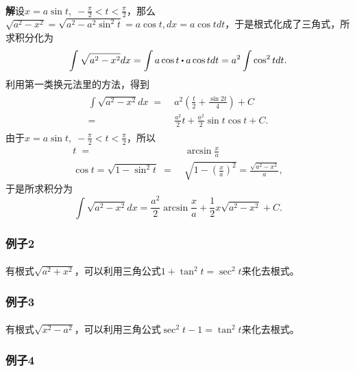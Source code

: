 \paragraph{}
\textbf{解\;}设$x=a\sin{t}, \; -\frac{\pi}{2} < t < \frac{\pi}{2}$，那么$\sqrt{a^2-x^2}=\sqrt{a^2-a^2\sin^2t} = a\cos{t}, dx = a\cos{t}dt$，于是根式化成了三角式，所求积分化为
\begin{equation}
  \int\sqrt{a^2-x^2}dx = \int a\cos{t} \bigcdot a\cos{t}dt = a^2\int \cos^2tdt.
\end{equation}
利用第一类换元法里的方法，得到
\begin{align*}
\begin{split}
  \int\sqrt{a^2 - x^2}dx \;=&\; a^2(\frac{t}{2}+\frac{\sin{2t}}{4}) + C \\
  =&\; \frac{a^2}{2}t + \frac{a^2}{2}\sin{t}\cos{t} + C.
\end{split}
\end{align*}
由于$x=a\sin{t},\; -\frac{\pi}{2} < t < \frac{\pi}{2}$，所以
\begin{align*}
  t \;=&\; \arcsin\frac{x}{a} \\
  \cos{t} = \sqrt{1-\sin^2t} \;=&\; \sqrt{1-(\frac{x}{a})^2} = \frac{\sqrt{a^2-x^2}}{a},
\end{align*}
于是所求积分为
\begin{equation*}
  \int\sqrt{a^2-x^2}dx = \frac{a^2}{2}\arcsin\frac{x}{a} + \frac{1}{2}x\sqrt{a^2-x^2} + C.
\end{equation*}

\subsubsection{例子2}
\paragraph{}
有根式$\sqrt{a^2 + x^2}$，可以利用三角公式$1 + \tan^2t = \sec^2t$来化去根式。

\subsubsection{例子3}
\paragraph{}
有根式$\sqrt{x^2 - a^2}$，可以利用三角公式$\sec^2t - 1 = \tan^2t$来化去根式。

\subsubsection{例子4}
